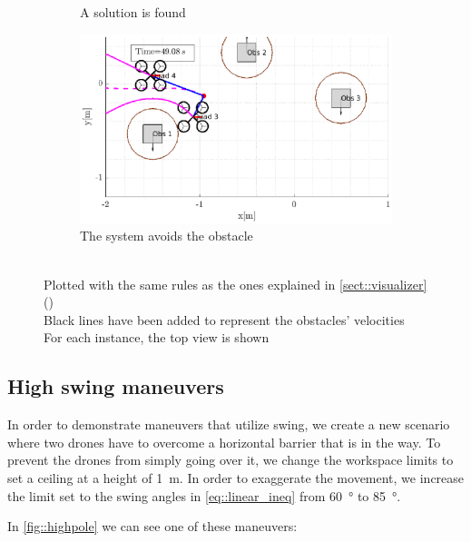 \begin{figure}
\begin{subfigure}{0.45\textwidth}
		\caption{A solution is found}
		\label{subfig::zigzag::found}
	\end{subfigure}
	\begin{subfigure}{0.45\textwidth}
		\centering
		\includegraphics[width=\textwidth]{Figures/zigzag/end}
		\caption{The system avoids the obstacle}
		\label{subfig::zigzag::end}
	\end{subfigure}
	\caption[Moving obstacle avoidance]{\\Plotted with the same rules as the ones explained in \cref{sect::visualizer} ()\\Black lines have been added to represent the obstacles' velocities\\For each instance, the top view is shown}
	\label{fig::zigzag}
\end{figure}

\subsection{High swing maneuvers}
In order to demonstrate maneuvers that utilize swing, we create a new scenario where two drones have to overcome a horizontal barrier that is in the way. To prevent the drones from simply going over it, we change the workspace limits to set a ceiling at a height of \SI{1}{\meter}. In order to exaggerate the movement, we increase the limit set to the swing angles in \cref{eq::linear_ineq} from \SI{60}{\degree} to \SI{85}{\degree}. 

In \cref{fig::highpole} we can see one of these maneuvers:


